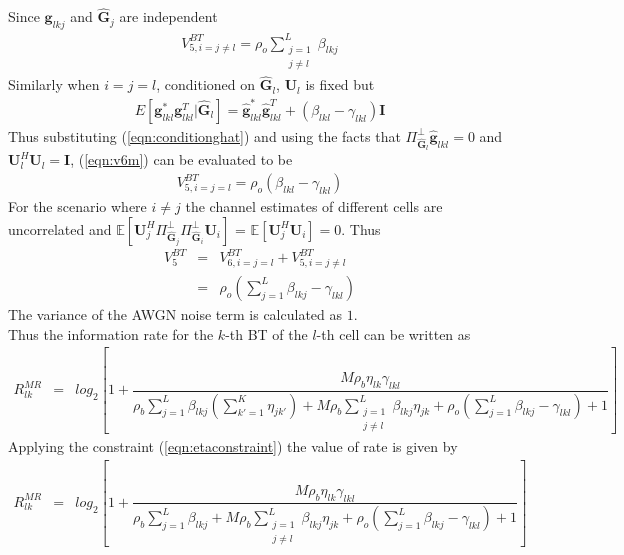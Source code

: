 \documentclass[10pt, a4paper, twoside,fleqn]{article}
\begin{document}
Since $\pmb{g}_{lkj}$ and $\pmb{\hat G}_j$ are independent
\begin{eqnarray}\label{eqn:v6neql}
V_{5,i=j\neq l}^{BT} = \rho_o\sum\limits_{\substack{j=1 \\ j \neq l}}^{L}\beta_{lkj}
\end{eqnarray}
Similarly when $i=j=l$, conditioned on $\pmb{\hat G}_l$, $\pmb{U}_l$ is fixed but
\begin{eqnarray}\label{eqn:conditionghat}
E[\pmb{g}_{lkl}^*\pmb{g}_{lkl}^T|\pmb{\hat G}_l] = \pmb{\hat g}_{lkl}^*\pmb{\hat g}_{lkl}^T + (\beta_{lkl}-\gamma_{lkl})\pmb{I}
\end{eqnarray}
Thus substituting (\ref{eqn:conditionghat}) and using the facts that $\Pi^{\perp}_{\pmb{\hat G}_l}\pmb{\hat g}_{lkl} = 0$ and $\pmb{U}_l^H\pmb{U}_l=\pmb{I}$, (\ref{eqn:v6m}) can be evaluated to be
\begin{eqnarray}\label{eqn:v6l}
V_{5,i=j=l}^{BT}= \rho_o(\beta_{lkl} -\gamma_{lkl})
\end{eqnarray}
For the scenario where $i\neq j$ the channel estimates of different cells are uncorrelated and $\mathbb{E}\left[\pmb{U}_j^H\Pi^{\perp}_{\pmb{\hat{G}}_j}\Pi^{\perp}_{\pmb{\hat{G}}_i} \pmb{U}_i\right]$ = $\mathbb{E}[\pmb{U}_j^H\pmb{U}_i] =0$. Thus
\begin{eqnarray}\label{eqn:v6}
   V_5^{BT} &=& V_{6,i=j=l}^{BT} + V_{5,i=j\neq l}^{BT} \nonumber \\ &=&\rho_o\left(\sum\limits_{j=1}^{L}\beta_{lkj}-\gamma_{lkl}\right)
\end{eqnarray}
The variance of the AWGN noise term is calculated as $1$.\\
Thus the information rate for the $k$-th BT of the $l$-th cell can be written as
\begin{eqnarray}\label{eqn:rateotwitheta}
R_{lk}^{MR} &=& log_2\left[1+\dfrac{M\rho_b\eta_{lk}\gamma_{lkl}}{ \rho_b\sum\limits_{j=1}^{L}\beta_{lkj}\left(\sum\limits_{k'=1}^K\eta_{jk'}\right) +M\rho_b\sum\limits_{\substack{j=1 \\ j \neq l}}^{L}\beta_{lkj}\eta_{jk} +\rho_o\left(\sum\limits_{j=1}^{L}\beta_{lkj} -\gamma_{lkl}\right)+1}\right]
\end{eqnarray}
Applying the constraint (\ref{eqn:etaconstraint}) the value of rate is given by
\begin{eqnarray}\label{eqn:rateot}
R_{lk}^{MR} &=& log_2\left[1+\dfrac{M\rho_b\eta_{lk}\gamma_{lkl}}{ \rho_b\sum\limits_{j=1}^{L}\beta_{lkj}+M\rho_b\sum\limits_{\substack{j=1 \\ j \neq l}}^{L}\beta_{lkj}\eta_{jk} +\rho_o\left(\sum\limits_{j=1}^{L}\beta_{lkj} -\gamma_{lkl}\right)+1}\right]
\end{eqnarray}
\end{document}
